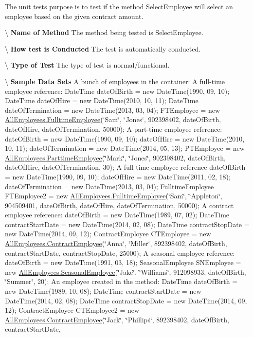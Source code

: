 The unit test\textquotesingle{}s purpose is to test if the method Select\+Employee will select an employee based on the given contract amount. 

\textbackslash{} {\bfseries  Name of Method} The method being tested is Select\+Employee.

\textbackslash{} {\bfseries  How test is Conducted} The test is automatically conducted.

\textbackslash{} {\bfseries  Type of Test} The type of test is normal/functional.

\textbackslash{} {\bfseries  Sample Data Sets} A bunch of employees in the container\+: A full-\/time employee reference\+: Date\+Time date\+Of\+Birth = new Date\+Time(1990, 09, 10); Date\+Time date\+Of\+Hire = new Date\+Time(2010, 10, 11); Date\+Time date\+Of\+Termination = new Date\+Time(2013, 03, 04); F\+T\+Employee = new \hyperlink{class_all_employees_1_1_fulltime_employee}{All\+Employees.\+Fulltime\+Employee}(\char`\"{}\+Sam\char`\"{}, \char`\"{}\+Jones\char`\"{}, 902398402, date\+Of\+Birth, date\+Of\+Hire, date\+Of\+Termination, 50000); A part-\/time employee reference\+: date\+Of\+Birth = new Date\+Time(1990, 09, 10); date\+Of\+Hire = new Date\+Time(2010, 10, 11); date\+Of\+Termination = new Date\+Time(2014, 05, 13); P\+T\+Employee = new \hyperlink{class_all_employees_1_1_parttime_employee}{All\+Employees.\+Parttime\+Employee}(\char`\"{}\+Mark\char`\"{}, \char`\"{}\+Jones\char`\"{}, 902398402, date\+Of\+Birth, date\+Of\+Hire, date\+Of\+Termination, 30); A full-\/time employee reference date\+Of\+Birth = new Date\+Time(1990, 09, 10); date\+Of\+Hire = new Date\+Time(2011, 02, 18); date\+Of\+Termination = new Date\+Time(2013, 03, 04); Fulltime\+Employee F\+T\+Employee2 = new \hyperlink{class_all_employees_1_1_fulltime_employee}{All\+Employees.\+Fulltime\+Employee}(\char`\"{}\+Sam\char`\"{}, \char`\"{}\+Appleton\char`\"{}, 904509401, date\+Of\+Birth, date\+Of\+Hire, date\+Of\+Termination, 50000); A contract employee reference\+: date\+Of\+Birth = new Date\+Time(1989, 07, 02); Date\+Time contract\+Start\+Date = new Date\+Time(2014, 02, 08); Date\+Time contract\+Stop\+Date = new Date\+Time(2014, 09, 12); Contract\+Employee C\+T\+Employee = new \hyperlink{class_all_employees_1_1_contract_employee}{All\+Employees.\+Contract\+Employee}(\char`\"{}\+Anna\char`\"{}, \char`\"{}\+Miller\char`\"{}, 892398402, date\+Of\+Birth, contract\+Start\+Date, contract\+Stop\+Date, 25000); A seasonal employee reference\+: date\+Of\+Birth = new Date\+Time(1991, 03, 18); Seasonal\+Employee S\+N\+Employee = new \hyperlink{class_all_employees_1_1_seasonal_employee}{All\+Employees.\+Seasonal\+Employee}(\char`\"{}\+Jake\char`\"{}, \char`\"{}\+Williams\char`\"{}, 912098933, date\+Of\+Birth, \char`\"{}\+Summer\char`\"{}, 20); An employee created in the method\+: Date\+Time date\+Of\+Birth = new Date\+Time(1989, 10, 08); Date\+Time contract\+Start\+Date = new Date\+Time(2014, 02, 08); Date\+Time contract\+Stop\+Date = new Date\+Time(2014, 09, 12); Contract\+Employee C\+T\+Employee2 = new \hyperlink{class_all_employees_1_1_contract_employee}{All\+Employees.\+Contract\+Employee}(\char`\"{}\+Jack\char`\"{}, \char`\"{}\+Phillips\char`\"{}, 892398402, date\+Of\+Birth, contract\+Start\+Date, 
